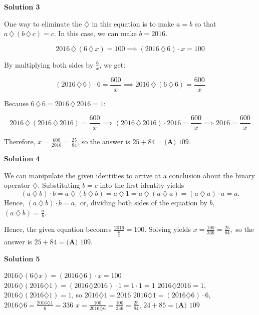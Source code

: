 \begin{enumerate}
 



\textbf{Solution 3}

One way to eliminate the $\diamondsuit$ in this equation is to make $a = b$ so that  $a\,\diamondsuit\, (b\,\diamondsuit \,c) = c$. In this case, we can make $b = 2016$.

 
 \[2016 \,\diamondsuit\, (6\,\diamondsuit\, x)=100\implies  (2016\, \diamondsuit\, 6) \cdot x = 100\]

 By multiplying both sides by $\frac{6}{x}$, we get:

 
 \[(2016\, \diamondsuit\, 6) \cdot 6 = \frac{600}{x}\implies  2016 \, \diamondsuit\, (6\, \diamondsuit\, 6) = \frac{600}{x}\]

 Because $6\, \diamondsuit\, 6 = 2016\, \diamondsuit\, 2016 = 1:$

 \[2016 \, \diamondsuit\, (2016\, \diamondsuit\, 2016) = \frac{600}{x}\implies  (2016\, \diamondsuit\, 2016) \cdot 2016 = \frac{600}{x}\implies  2016 = \frac{600}{x}\]

 Therefore, $x = \frac{600}{2016} = \frac{25}{84}$, so the answer is $25 + 84 = \boxed{\textbf{(A) }109.}$




\textbf{Solution 4}

We can manipulate the given identities to arrive at a conclusion about the binary operator $\diamondsuit$.  Substituting $b = c$ into the first identity yields 
 \[( a\ \diamondsuit\ b) \cdot b = a\ \diamondsuit\ (b\ \diamondsuit\  b) = a\ \diamondsuit\  1 = a\ \diamondsuit\ ( a\ \diamondsuit\ a) = ( a\ \diamondsuit\ a) \cdot a = a.\]  Hence, $( a\ \diamondsuit\ b) \cdot b = a,$ or, dividing both sides of the equation by $b,$ $( a\ \diamondsuit\ b) = \frac{a}{b}.$

 Hence, the given equation becomes $\frac{2016}{\frac{6}{x}} = 100$.  Solving yields $x=\frac{100}{336} = \frac{25}{84},$ so the answer is $25 + 84 = \boxed{\textbf{(A) }109.}$




\textbf{Solution 5}

$2016 \diamondsuit (6 \diamondsuit x) = (2016 \diamondsuit 6) \cdot x = 100$
$2016 \diamondsuit (2016 \diamondsuit 1) = (2016 \diamondsuit 2016) \cdot 1 = 1 \cdot 1 = 1$
$2016 \diamondsuit 2016 = 1$, $2016 \diamondsuit (2016 \diamondsuit 1) = 1$, so $2016 \diamondsuit 1 = 2016$
$2016  \diamondsuit 1 = (2016  \diamondsuit 6) \cdot 6$, $2016 \diamondsuit 6 = \frac{2016  \diamondsuit 1}{6} = 336$
$x = \frac{100}{2016 \diamondsuit 6} = \frac{100}{336} = \frac{25}{84}$, $24 + 85 = \boxed{\textbf{(A) }109}$





\end{enumerate}
